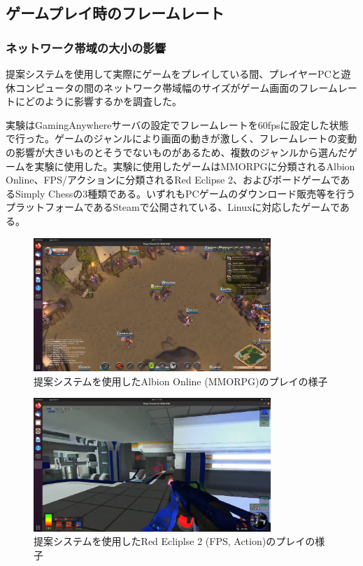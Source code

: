 \subsection{ゲームプレイ時のフレームレート}

\subsubsection{ネットワーク帯域の大小の影響}
提案システムを使用して実際にゲームをプレイしている間、プレイヤーPCと遊休コンピュータの間のネットワーク帯域幅のサイズがゲーム画面のフレームレートにどのように影響するかを調査した。

実験はGamingAnywhereサーバの設定でフレームレートを60fpsに設定した状態で行った。ゲームのジャンルにより画面の動きが激しく、フレームレートの変動の影響が大きいものとそうでないものがあるため、複数のジャンルから選んだゲームを実験に使用した。実験に使用したゲームはMMORPGに分類されるAlbion Online\cite{albiononline}、FPS/アクションに分類されるRed Eclipse 2\cite{redeclipse}、およびボードゲームであるSimply Chess\cite{simplychess}の3種類である。いずれもPCゲームのダウンロード販売等を行うプラットフォームであるSteam\cite{steam}で公開されている、Linuxに対応したゲームである。

\begin{figure}[t]
    \centering
    \includegraphics[width=0.8\textwidth,keepaspectratio,clip]{img/screen_mmo.pdf}
    \caption{提案システムを使用したAlbion Online (MMORPG)のプレイの様子}
    \label{fig:screen_mmo}
\end{figure}

\begin{figure}[t]
    \centering
    \includegraphics[width=0.8\textwidth,keepaspectratio,clip]{img/screen_fps.pdf}
    \caption{提案システムを使用したRed Ecliplse 2 (FPS, Action)のプレイの様子}
    \label{fig:screen_fps}
\end{figure}

